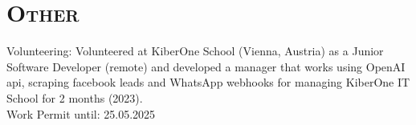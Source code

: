 \section{\textsc{Other}}


Volunteering: Volunteered at KiberOne School (Vienna, Austria) as a Junior Software Developer (remote) and developed a manager that works using OpenAI api, scraping facebook leads and WhatsApp webhooks for managing KiberOne IT School for 2 months (2023). \\
Work Permit until: 25.05.2025

